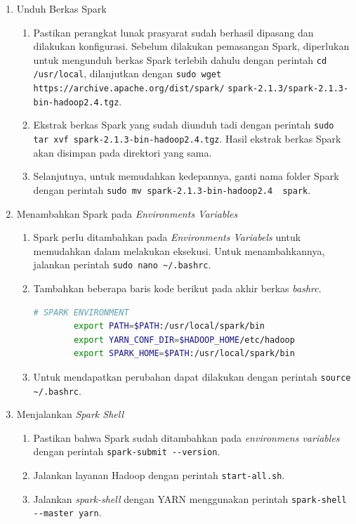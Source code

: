 \begin{enumerate}
  \item Unduh Berkas Spark
  \begin{enumerate}
    \item Pastikan perangkat lunak prasyarat sudah berhasil dipasang dan dilakukan konfigurasi. Sebelum dilakukan pemasangan Spark, diperlukan untuk mengunduh berkas Spark terlebih dahulu dengan perintah \verb|cd /usr/local|, dilanjutkan dengan \verb|sudo wget https://archive.apache.org/dist/spark/|
    \newline \verb|spark-2.1.3/spark-2.1.3-bin-hadoop2.4.tgz|.    
    \item Ekstrak berkas Spark yang sudah diunduh tadi dengan perintah \verb|sudo tar xvf spark-2.1.3-bin-hadoop2.4.tgz|. Hasil ekstrak berkas Spark akan disimpan pada direktori yang sama.
    \item Selanjutnya, untuk memudahkan kedepannya, ganti nama folder Spark dengan perintah \verb|sudo mv spark-2.1.3-bin-hadoop2.4  spark|. 
  \end{enumerate}
  \item Menambahkan Spark pada \textit{Environments Variables}
  \begin{enumerate}
    \item Spark perlu ditambahkan pada \textit{Environments Variabels} untuk memudahkan dalam melakukan eksekusi. Untuk menambahkannya, jalankan perintah \verb|sudo nano ~/.bashrc|.
    \item Tambahkan beberapa baris kode berikut pada akhir berkas \textit{bashrc}.
      \begin{lstlisting}[language=bash]
		# SPARK ENVIRONMENT
		export PATH=$PATH:/usr/local/spark/bin
		export YARN_CONF_DIR=$HADOOP_HOME/etc/hadoop
		export SPARK_HOME=$PATH:/usr/local/spark/bin
      \end{lstlisting}
    \item Untuk mendapatkan perubahan dapat dilakukan dengan perintah \verb|source ~/.bashrc|.
  \end{enumerate}
  \item Menjalankan \textit{Spark Shell}
  \begin{enumerate}
    \item Pastikan bahwa Spark sudah ditambahkan pada \textit{environmens variables} dengan perintah \verb|spark-submit --version|.
    \item Jalankan layanan Hadoop dengan perintah \verb|start-all.sh|.
    \item Jalankan \textit{spark-shell} dengan YARN menggunakan perintah \verb|spark-shell --master yarn|.
  \end{enumerate}
\end{enumerate}


